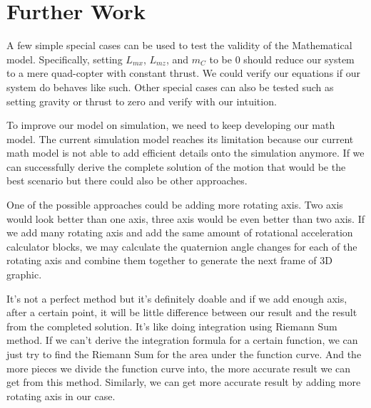 \section{Further Work}  
A few simple special cases can be used to test the validity of the Mathematical model. Specifically, setting $L_{mx}$, $L_{mz}$, and $m_C$ to be 0 should reduce our system to a mere quad-copter with constant thrust. We could verify our equations if our system do behaves like such. Other special cases can also be tested such as setting gravity or thrust to zero and verify with our intuition.
\par 
To improve our model on simulation, we need to keep developing our math model. The current simulation model reaches its limitation because our current math model is not able to add efficient details onto the simulation anymore. If we can successfully derive the complete solution of the motion that would be the best scenario but there could also be other approaches. 
\par
One of the possible approaches could be adding more rotating axis. Two axis would look better than one axis, three axis would be even better than two axis. If we add many rotating axis and add the same amount of rotational acceleration calculator blocks, we may calculate the quaternion angle changes for each of the rotating axis and combine them together to generate the next frame of 3D graphic.
\par
It's not a perfect method but it's definitely doable and if we add enough axis, after a certain point, it will be little difference between our result and the result from the completed solution. It's like doing integration using Riemann Sum method. If we can't derive the integration formula for a certain function, we can just try to find the Riemann Sum for the area under the function curve. And the more pieces we divide the function curve into, the more accurate result we can get from this method. Similarly, we can get more accurate result by adding more rotating axis in our case.
\par


